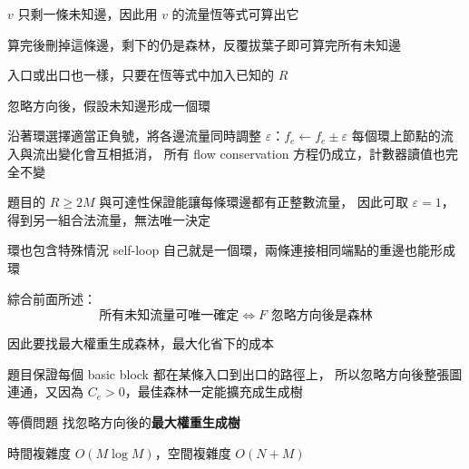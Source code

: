 \begin{frame}{}
    $v$ 只剩一條未知邊，因此用 $v$ 的流量恆等式可算出它

    算完後刪掉這條邊，剩下的仍是森林，反覆拔葉子即可算完所有未知邊

    入口或出口也一樣，只要在恆等式中加入已知的 $R$
\end{frame}

\begin{frame}{}
    忽略方向後，假設未知邊形成一個環

    沿著環選擇適當正負號，將各邊流量同時調整 $\varepsilon$：$f_e\longleftarrow f_e\pm\varepsilon$
    每個環上節點的流入與流出變化會互相抵消，
    所有 flow conservation 方程仍成立，計數器讀值也完全不變
\end{frame}

\begin{frame}{}
    題目的 $R\ge 2M$ 與可達性保證能讓每條環邊都有正整數流量，
    因此可取 $\varepsilon=1$，得到另一組合法流量，無法唯一決定

    \begin{alertblock}{環也包含特殊情況}
        self-loop 自己就是一個環，兩條連接相同端點的重邊也能形成環
    \end{alertblock}
\end{frame}

\begin{frame}{}
    綜合前面所述：
    \[
        \boxed{\text{所有未知流量可唯一確定}\iff F\text{ 忽略方向後是森林}}
    \]

    因此要找最大權重生成森林，最大化省下的成本
\end{frame}

\begin{frame}{}
    題目保證每個 basic block 都在某條入口到出口的路徑上，
    所以忽略方向後整張圖連通，又因為 $C_e>0$，最佳森林一定能擴充成生成樹

    \begin{block}{等價問題}
        找忽略方向後的\textbf{最大權重生成樹}
    \end{block}

    時間複雜度 $O(M\log M)$，空間複雜度 $O(N+M)$
\end{frame}


